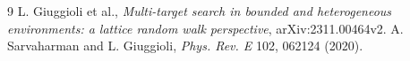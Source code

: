 \documentclass[11pt]{ctexart}
\begin{document}
\begin{table}[!htbp]
  \centering
  \caption{代表性案例配置（详见 \texttt{data/model\_configs.csv}）。}
  \label{tab:configs}
  
\end{table}

\begin{table}[!htbp]
  \centering
  \caption{峰位置与判据（$t_1$ 为最早峰，$t_2$ 为最晚峰）。}
  \label{tab:peaks}
  
\end{table}

\begin{thebibliography}{9}
L. Giuggioli et al., \emph{Multi-target search in bounded and heterogeneous environments: a lattice random walk perspective}, arXiv:2311.00464v2.
A. Sarvaharman and L. Giuggioli, \emph{Phys. Rev. E} 102, 062124 (2020).
\end{thebibliography}
\end{document}
